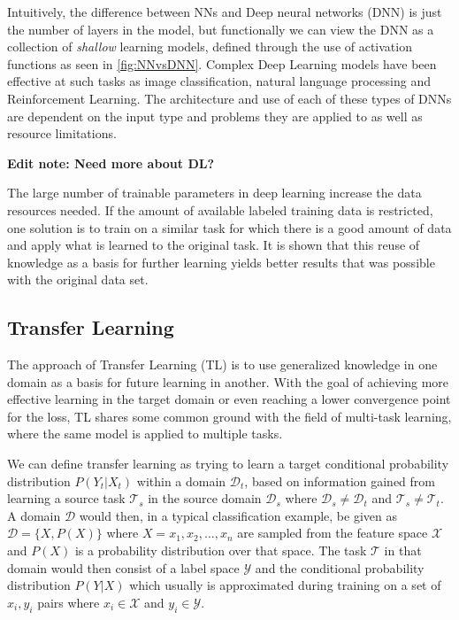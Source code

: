 Intuitively, the difference between NNs and Deep neural networks (DNN) is just the number of layers in the model, but functionally we can view the DNN as a collection of \textit{shallow} learning models, defined through the use of activation functions as seen in \ref{fig:NNvsDNN}. Complex Deep Learning models have been effective at such tasks as image classification\cite{imageclassification}, natural language processing\cite{deepnlp} and Reinforcement Learning\cite{deepreinforcementlearning}. The architecture and use of each of these types of DNNs are dependent on the input type and problems they are applied to as well as resource limitations.

\textbf{Edit note: Need more about DL?}

The large number of trainable parameters in deep learning increase the data resources needed. If the amount of available labeled training data is restricted, one solution is to train on a similar task for which there is a good amount of data and apply what is learned to the original task. It is shown that this reuse of knowledge as a basis for further learning yields better results that was possible with the original data set\cite{pathnet, progressiveneuralnetworks, tradaboost}. 

\subsection{Transfer Learning}
The approach of Transfer Learning (TL) is to use generalized knowledge in one domain as a basis for future learning in another. With the goal of achieving more effective learning in the target domain or even reaching a lower convergence point for the loss, TL shares some common ground with the field of multi-task learning, where the same model is applied to multiple tasks. 

We can define transfer learning as trying to learn a target conditional probability distribution \(P(Y_{t}|X_{t})\) within a domain \(\mathcal{D}_{t}\), based on information gained from learning a source task \(\mathcal{T}_{s}\) in the source domain \(\mathcal{D}_{s}\) where \(\mathcal{D}_{s} \neq \mathcal{D}_{t}\) and \(\mathcal{T}_{s} \neq \mathcal{T}_{t}\). A domain \(\mathcal{D}\) would then, in a typical classification example, be given as \(\mathcal{D} = \{X, P(X)\}\) where \(X = x_{1},x_{2}, \dotsc ,x_{n}\) are sampled from the feature space \(\mathcal{X}\) and \(P(X)\) is a probability distribution over that space. The task \(\mathcal{T}\) in that domain would then consist of a label space \(\mathcal{Y}\) and the conditional probability distribution \(P(Y|X)\) which usually is approximated during training on a set of \(x_{i}, y_{i}\) pairs where \(x_{i} \in \mathcal{X}\) and \(y_{i} \in \mathcal{Y}\).
\newline\newline

